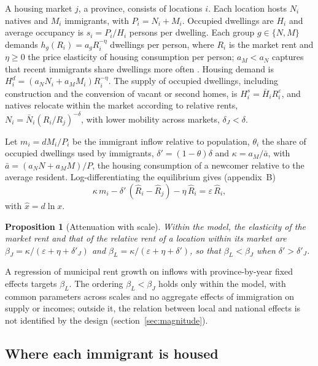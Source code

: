\documentclass[11pt,a4paper]{article}
\newtheorem{proposicion}{Proposition}
\begin{document}
A housing market $j$, a province, consists of locations $i$. Each location hosts $N_i$ natives and $M_i$ immigrants, with $P_i=N_i+M_i$. Occupied dwellings are $H_i$ and average occupancy is $s_i=P_i/H_i$ persons per dwelling. Each group $g\in\{N,M\}$ demands $h_g(R_i)=a_gR_i^{-\eta}$ dwellings per person, where $R_i$ is the market rent and $\eta\ge 0$ the price elasticity of housing consumption per person; $a_M<a_N$ captures that recent immigrants share dwellings more often \citep{myerslee1996}. Housing demand is $H_i^d=(a_NN_i+a_MM_i)R_i^{-\eta}$. The supply of occupied dwellings, including construction and the conversion of vacant or second homes, is $H_i^s=\bar H_iR_i^{\varepsilon}$, and natives relocate within the market according to relative rents, $N_i=\bar N_i(R_i/R_j)^{-\delta}$, with lower mobility across markets, $\delta_J<\delta$.

Let $m_i=dM_i/P_i$ be the immigrant inflow relative to population, $\theta_i$ the share of occupied dwellings used by immigrants, $\delta'=(1-\theta)\delta$ and $\kappa=a_M/\bar a$, with $\bar a=(a_NN+a_MM)/P$, the housing consumption of a newcomer relative to the average resident. Log-differentiating the equilibrium gives (appendix~B)
\begin{equation}\label{eq:eq}
\kappa\, m_i-\delta'\,(\hat R_i-\hat R_j)-\eta\,\hat R_i=\varepsilon\,\hat R_i ,
\end{equation}
with $\hat x=d\ln x$.

\begin{proposicion}[Attenuation with scale]\label{prop:scale}
Within the model, the elasticity of the market rent and that of the relative rent of a location within its market are $\beta_J=\kappa/(\varepsilon+\eta+\delta'_J)$ and $\beta_L=\kappa/(\varepsilon+\eta+\delta')$, so that $\beta_L<\beta_J$ when $\delta'>\delta'_J$.
\end{proposicion}

A regression of municipal rent growth on inflows with province-by-year fixed effects targets $\beta_L$. The ordering $\beta_L<\beta_J$ holds only within the model, with common parameters across scales and no aggregate effects of immigration on supply or incomes; outside it, the relation between local and national effects is not identified by the design (section~\ref{sec:magnitude}).

\subsection{Where each immigrant is housed}
\end{document}
